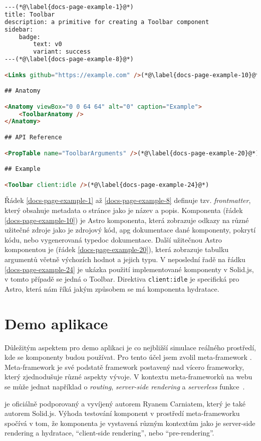 \begin{lstlisting}[caption={Ukázka stránky dokumentace psané v MDX}, label={docs-page-example}, language=html]
---(*@\label{docs-page-example-1}@*)
title: Toolbar
description: a primitive for creating a Toolbar component
sidebar:
    badge:
        text: v0
        variant: success
---(*@\label{docs-page-example-8}@*)

<Links github="https://example.com" />(*@\label{docs-page-example-10}@*)

## Anatomy

<Anatomy viewBox="0 0 64 64" alt="0" caption="Example">
    <ToolbarAnatomy />
</Anatomy>

## API Reference

<PropTable name="ToolbarArguments" />(*@\label{docs-page-example-20}@*)

## Example

<Toolbar client:idle />(*@\label{docs-page-example-24}@*)
\end{lstlisting}

Řádek \ref{docs-page-example-1} až \ref{docs-page-example-8} definuje tzv. \textit{frontmatter}, který obsahuje metadata o stránce jako je název a popis.
Komponenta  (řádek \ref{docs-page-example-10}) je Astro komponenta, která zobrazuje odkazy na různé užitečné zdroje jako je zdrojový kód, \gls{apg} dokumentace dané komponenty, pokrytí kódu, nebo vygenerovaná typedoc dokumentace.
Další užitečnou Astro komponentou je  (řádek \ref{docs-page-example-20}), která zobrazuje tabulku argumentů včetně výchozích hodnot a jejich typu.
V neposlední řadě na řádku \ref{docs-page-example-24} je ukázka použití implementované komponenty v Solid.js, v tomto případě se jedná o Toolbar.
Direktiva \texttt{client:idle} je specifická pro Astro, která nám říká jakým způsobem se má komponenta \gls{hydratace}.

\section{Demo aplikace}

Důležitým aspektem pro demo aplikaci je co nejbližší simulace reálného prostředí, kde se komponenty budou používat.
Pro tento účel jsem zvolil meta-framework . Meta-framework je své podstatě framework postavený nad vícero frameworky, který zjednodušuje různé aspekty vývoje.
V kontextu meta-frameworků na webu se může jednat například o \textit{routing}, \textit{server-side rendering} a \textit{serverless} funkce~\cite{prismic-metaframework}.

 je oficiálně podporovaný a vyvíjený autorem Ryanem Carniatem, který je také autorem Solid.js.
Výhoda testování komponent v prostředí meta-frameworku spočívá v tom, že komponenta je vystavená různým kontextům jako je server-side rendering a hydratace, ``client-side rendering'', nebo ``pre-rendering''.
